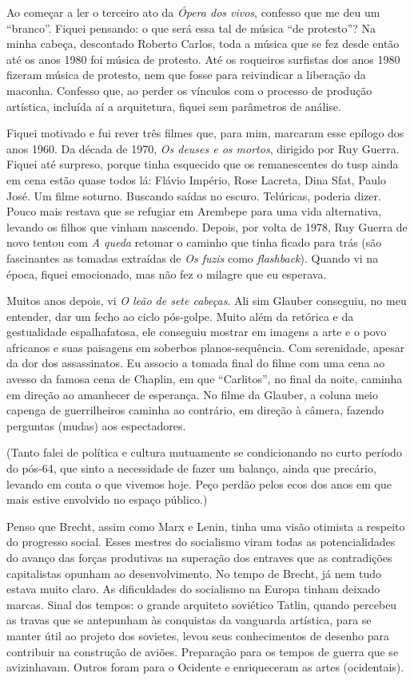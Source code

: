 Ao começar a ler o terceiro ato da {\it Ópera dos vivos}, confesso que me
deu um “branco”. Fiquei pensando: o que será essa tal de música “de
protesto”? Na minha cabeça, descontado Roberto Carlos, toda a música que
se fez desde então até os anos 1980 foi música de protesto. Até os
roqueiros surfistas dos anos 1980 fizeram música de protesto, nem que fosse
para reivindicar a liberação da maconha. Confesso que, ao perder os
vínculos com o processo de produção artística, incluída aí a arquitetura,
fiquei sem parâmetros de análise.

Fiquei motivado e fui rever três filmes que, para mim, marcaram esse
epílogo dos anos 1960. Da década de 1970, {\it Os deuses e os mortos}, dirigido
por Ruy Guerra. Fiquei até surpreso, porque tinha esquecido que os
remanescentes do {\sc tusp} ainda em cena estão quase todos lá: Flávio
Império, Rose Lacreta, Dina Sfat, Paulo José. Um filme soturno. Buscando
saídas no escuro. Telúricas, poderia dizer. Pouco mais restava que se
refugiar em Arembepe para uma vida alternativa, levando os filhos que
vinham nascendo. Depois, por volta de 1978, Ruy Guerra de novo tentou com {\it A
queda} retomar o caminho que tinha ficado para trás (são fascinantes as
tomadas extraídas de {\it Os fuzis} como {\it flashback}). Quando vi na
época, fiquei emocionado, mas não fez o milagre que eu esperava.

Muitos anos depois, vi {\it O leão de sete cabeças}. Ali sim Glauber
conseguiu, no meu entender, dar um fecho ao ciclo pós-golpe. Muito além
da retórica e da gestualidade espalhafatosa, ele conseguiu mostrar em
imagens a arte e o povo africanos e suas paisagens em soberbos
planos-sequência. Com serenidade, apesar da dor dos assassinatos.
Eu associo a tomada final do filme com uma cena ao avesso da famosa cena
de Chaplin, em que “Carlitos”, no final da noite, caminha em direção ao
amanhecer de esperança. No filme da Glauber, a coluna meio capenga de
guerrilheiros caminha ao contrário, em direção à câmera, fazendo perguntas
(mudas) aos espectadores.

(Tanto falei de política e cultura mutuamente se condicionando no
curto período do pós-64, que sinto a necessidade de fazer um balanço,
ainda que precário, levando em conta o que vivemos hoje. Peço perdão
pelos ecos dos anos em que mais estive envolvido no espaço público.)

Penso que Brecht, assim como Marx e Lenin, tinha uma visão otimista a
respeito do progresso social. Esses mestres do socialismo viram todas as
potencialidades do avanço das forças produtivas na superação dos
entraves que as contradições capitalistas opunham ao desenvolvimento. No
tempo de Brecht, já nem tudo estava muito claro. As dificuldades do
socialismo na Europa tinham deixado marcas. Sinal dos tempos: o grande
arquiteto soviético Tatlin, quando percebeu as travas que se antepunham
às conquistas da vanguarda artística, para se manter útil ao projeto dos
sovietes, levou seus conhecimentos de desenho para contribuir na
construção de aviões. Preparação para os tempos de guerra que se
avizinhavam. Outros foram para o Ocidente e enriqueceram as artes (ocidentais).

